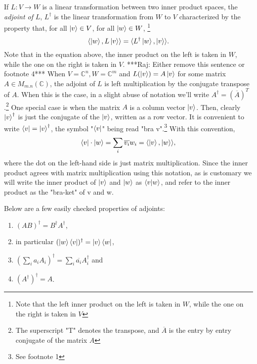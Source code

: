 If $L:V \to W$ is a linear transformation between two inner product spaces, the {\emph{adjoint of }}$L$, $L^\dagger$ is the linear transformation from $W$ to $V$ characterized by the property that, \textrm{ for all } $\ket{v} \in V$, \textrm{ for all }$\ket{w} \in W$, \footnote{Note that the left inner product on the left is taken in $W$, while the one on the right is taken in $V$}
\begin{equation}
    \langle\ket{w}, L\ket{v}\rangle=\langle L^\dagger \ket{w}, \ket{v}\rangle .
\end{equation}
Note that in the equation above, the inner product on the left is taken in $W$, while the one on the right is taken in $V$.  ***Raj: Either remove this sentence or footnote 4*** When $V={\mathbb{C}}^n, W={\mathbb{C}}^m$ and $L(\ket{v})=A\ket{v}$ for some matrix $A \in M_{m.n}(\mathbb{C})$, the adjoint of $L$ is left multiplication by the conjugate transpose of $A$.  When this is the case, in a slight abuse of notation we'll write $A^\dagger=(\overline{A})^T$.\footnote{The superscript "T" denotes the transpose, and $\overline{A}$ is the entry by entry conjugate of the matrix $A$} One special case is when the matrix $A$ is a column vector $\ket{v}$.  Then, clearly $\ket{v}^\dagger$ is just the conjugate of the $\ket{v}$, written as a row vector.  It is convenient to write $\bra{v}={\ket{v}}^\dagger$, the symbol "$\bra{v}$" being read "bra v".\footnote{See footnote 1}  With this convention,
\begin{equation}
\bra{v}\cdot \ket{w}=\sum_i \overline{v_i}w_i=\langle \ket{v},\ket{w}\rangle,
\end{equation}
where the dot on the left-hand side is just matrix multiplication.  Since the inner product agrees with matrix multiplication using this notation, as is customary we will write the inner product of $\ket{v}$ and $\ket{w}$ as $\braket{v|w}$, and refer to the inner product as the "bra-ket" of v and w.

Below are a few easily checked properties of adjoints:
\begin{enumerate}
    \item $(AB)^\dagger=B^\dagger A^\dagger$,
    \item in particular $(\ket{w}\bra{v})^\dagger=\ket{v}\bra{w}$,
    \item $(\sum_i a_i A_i)^\dagger=\sum_i \overline{a_i} A_i^\dagger$ and 
    \item $(A^\dagger)^\dagger=A$.
\end{enumerate}


